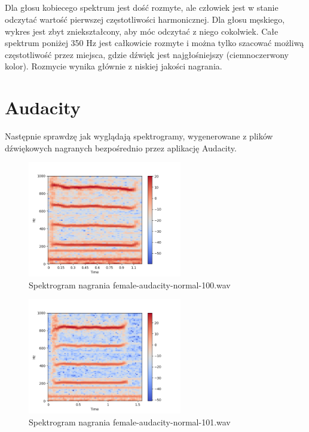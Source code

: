\documentclass[a4paper,12pt]{extarticle}
\begin{document}
\subsection*{}
Dla głosu kobiecego spektrum jest dość rozmyte, ale człowiek jest w stanie odczytać wartość pierwszej częstotliwości harmonicznej. Dla głosu męskiego, wykres jest zbyt zniekształcony, aby móc odczytać z niego cokolwiek. Całe spektrum poniżej 350 Hz jest całkowicie rozmyte i można tylko szacować możliwą częstotliwość przez miejsca, gdzie dźwięk jest najgłośniejszy (ciemnoczerwony kolor). Rozmycie wynika głównie z niskiej jakości nagrania.

\newpage

\section*{Audacity}

Następnie sprawdzę jak wyglądają spektrogramy, wygenerowane z plików dźwiękowych nagranych bezpośrednio przez aplikację Audacity.

\begin{figure}[h]
\centering
\includegraphics[width=0.6\textwidth]{audacity-0}
\caption{Spektrogram nagrania female-audacity-normal-100.wav}
\end{figure}

\begin{figure}[h]
\centering
\includegraphics[width=0.6\textwidth]{audacity-1}
\caption{Spektrogram nagrania female-audacity-normal-101.wav}
\end{figure}
\end{document}
